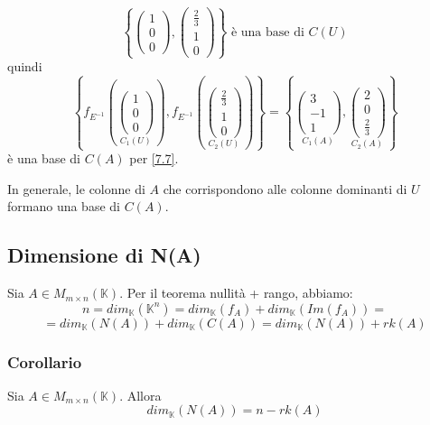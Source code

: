 \documentclass[a4paper]{article}
\theoremstyle{break}
\theoremstyle{break}
\theoremstyle{break}
\theoremstyle{break}
\begin{document}
\begin{example}
  \[
  \left\{ \begin{pmatrix} 1\\0\\0 \end{pmatrix},
    \begin{pmatrix} \frac{2}{3}\\1\\0 \end{pmatrix} 
  \right\} \text{ è una base di } C(U)
  \] 
  quindi
  \[
    \left\{ f_{E^{-1}} \left( \underset{C_1(U)}{\begin{pmatrix} 1\\0\\0 \end{pmatrix}}  \right),
      f_{E^{-1}} \left( \underset{C_2(U)}{\begin{pmatrix} \frac{2}{3}\\1\\0 \end{pmatrix}}  \right)
  \right\} =
  \left\{ \underset{C_1(A)}{\begin{pmatrix} 3\\-1\\1 \end{pmatrix}}, 
  \underset{C_2(A)}{\begin{pmatrix} 2\\0\\\frac{2}{3} \end{pmatrix}} 
  \right\} 
  \] 
  è una base di \( C(A) \) per \ref{7.7}.
\end{example}
In generale, le colonne di \( A \) che corrispondono alle colonne dominanti di \( U \) 
formano una base di \( C(A) \).

\subsection{Dimensione di N(A)}
Sia \( A \in M_{m \times n}(\mathbb{K}) \). Per il teorema nullità + rango, abbiamo:
\[
 n = dim_{\mathbb{K}}(\mathbb{K}^n) = dim_{\mathbb{K}}(f_A) + dim_{\mathbb{K}}(Im(f_A)) =
\] 
\[
 = dim_{\mathbb{K}}(N(A)) + dim_{\mathbb{K}}(C(A)) = dim_{\mathbb{K}}(N(A)) + rk(A)
\] 

\subsubsection{Corollario}
Sia \( A \in  M_{m \times n}(\mathbb{K}) \). Allora
\[
  dim_{\mathbb{K}}(N(A)) = n - rk(A)
\] 
\end{document}
